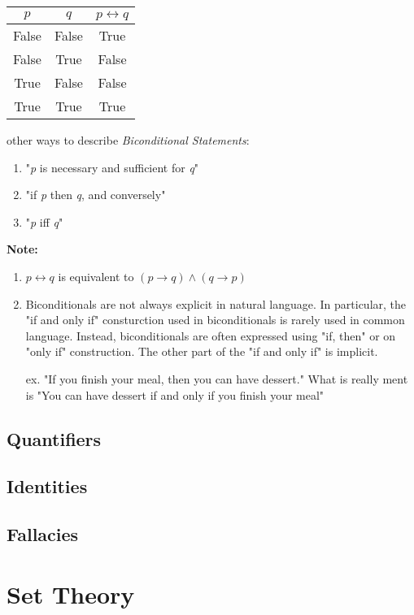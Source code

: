 \documentclass{book}
\begin{document}
\begin{enumerate}
\begin{center}
\begin{tabular}{ |c|c|c|}
\hline
$p$ & $q$ & $p \leftrightarrow q$  \\ \hline
False & False & True \\
False & True & False \\
True & False & False \\
True & True & True \\ \hline
\end{tabular}
\end{center}

other ways to describe \emph{Biconditional Statements}:
\begin{enumerate}
\item "\emph{p} is necessary and sufficient for \emph{q}"
\item "if \emph{p} then \emph{q}, and conversely"
\item "\emph{p} iff \emph{q}"
\end{enumerate}

\textbf{Note:} 
\begin{enumerate}
\item $p \leftrightarrow q$ is equivalent to $(p \to q) \land (q \to p)$
\item Biconditionals are not always explicit in natural language. In particular, the "if and only if" consturction used in biconditionals is rarely used in common language. Instead, biconditionals are often expressed using "if, then" or on "only if" construction. The other part of the  "if and only if" is implicit.

ex. "If you finish your meal, then you can have dessert." What is really ment is "You can have dessert if and only if you finish your meal"
\end{enumerate}
\end{enumerate}

\subsection {Quantifiers}
\subsection {Identities}
\subsection {Fallacies}

\section {Set Theory}
\end{document}
